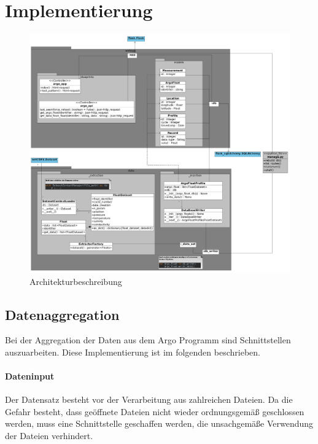 \section{Implementierung}

\begin{figure}[h]
 \centering
 \includegraphics[width=\textwidth]{pix/Modulschema_komplett.png}
 \caption{Architekturbeschreibung}
 \label{fig:modulschema}
\end{figure}


\subsection{Datenaggregation}

Bei der Aggregation der Daten aus dem Argo Programm sind Schnittstellen auszuarbeiten. Diese Implementierung ist im folgenden beschrieben. 

\paragraph{Dateninput}

Der Datensatz besteht vor der Verarbeitung aus zahlreichen Dateien. Da die Gefahr besteht, dass geöffnete Dateien nicht wieder ordnungsgemäß geschlossen werden, muss eine Schnittstelle geschaffen werden, die unsachgemäße Verwendung der Dateien verhindert. 

